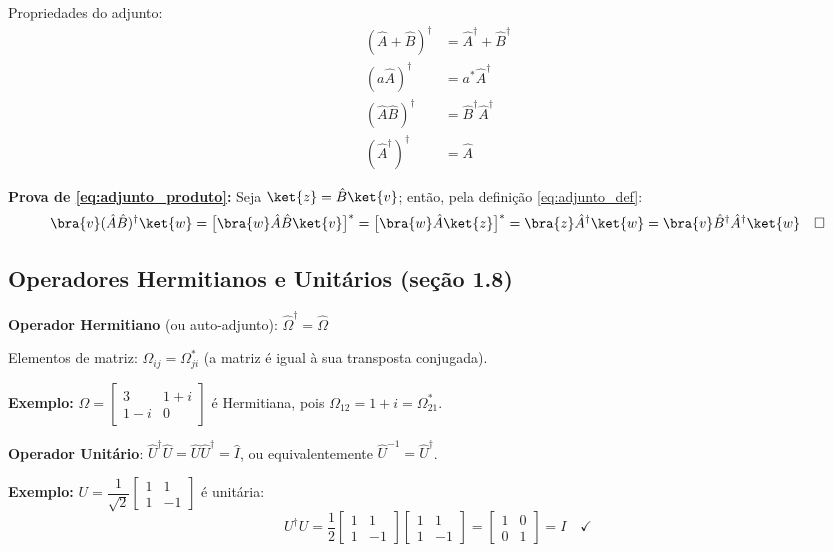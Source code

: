 Propriedades do adjunto:
\begin{align}
    (\hat{A} + \hat{B})^\dagger &= \hat{A}^\dagger + \hat{B}^\dagger \\
    (a\hat{A})^\dagger &= a^*\hat{A}^\dagger \\
    (\hat{A}\hat{B})^\dagger &= \hat{B}^\dagger\hat{A}^\dagger \label{eq:adjunto_produto} \\
    (\hat{A}^\dagger)^\dagger &= \hat{A}
\end{align}

\textbf{Prova de \eqref{eq:adjunto_produto}:}
Seja $\ket{z} = \hat{B}\ket{v}$; então, pela definição \eqref{eq:adjunto_def}:
\[
    \bra{v}(\hat{A}\hat{B})^\dagger\ket{w}
    = \bigl[\bra{w}\hat{A}\hat{B}\ket{v}\bigr]^*
    = \bigl[\bra{w}\hat{A}\ket{z}\bigr]^*
    = \bra{z}\hat{A}^\dagger\ket{w}
    = \bra{v}\hat{B}^\dagger\hat{A}^\dagger\ket{w} \quad \square
\]

\subsection*{Operadores Hermitianos e Unitários (seção 1.8)}

\begin{shadequote}
    \textbf{Operador Hermitiano} (ou auto-adjunto): $\hat{\Omega}^\dagger = \hat{\Omega}$

    Elementos de matriz: $\Omega_{ij} = \Omega_{ji}^*$ (a matriz é igual à sua transposta conjugada).
\end{shadequote}

\textbf{Exemplo:} $\displaystyle\Omega = \begin{bmatrix} 3 & 1+i \\ 1-i & 0 \end{bmatrix}$
é Hermitiana, pois $\Omega_{12} = 1+i = \Omega_{21}^*$.

\begin{shadequote}
    \textbf{Operador Unitário}: $\hat{U}^\dagger\hat{U} = \hat{U}\hat{U}^\dagger = \hat{I}$, ou equivalentemente $\hat{U}^{-1} = \hat{U}^\dagger$.
\end{shadequote}

\textbf{Exemplo:} $U = \dfrac{1}{\sqrt{2}}\begin{bmatrix} 1 & 1 \\ 1 & -1 \end{bmatrix}$ é unitária:
\[
    U^\dagger U = \frac{1}{2}\begin{bmatrix} 1 & 1 \\ 1 & -1 \end{bmatrix}\begin{bmatrix} 1 & 1 \\ 1 & -1 \end{bmatrix} = \begin{bmatrix} 1 & 0 \\ 0 & 1 \end{bmatrix} = I \quad \checkmark
\]


